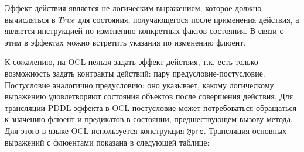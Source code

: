 Эффект действия является не логическим выражением, которое должно вычисляться в $True$ для состояния, получающегося после применения действия, а является инструкцией по изменению конкретных фактов состояния. В связи с этим в эффектах можно встретить указания по изменению флюент. 

К сожалению, на OCL нельзя задать эффект действия, т.к. есть только возможность задать контракты действий: пару предусловие-постусловие. Постусловие аналогично предусловию: оно указывает, какому логическому выражению удовлетворяют состояния объектов после совершения действия. Для трансляции PDDL-эффекта в OCL-постусловие может потребоваться обращаться к значению флюент и предикатов в состоянии, предшествующем вызову метода. Для этого в языке OCL используется конструкция \texttt{@pre}. Трансляция основных выражений с флюентами показана в следующей таблице:
\\[2pt]

